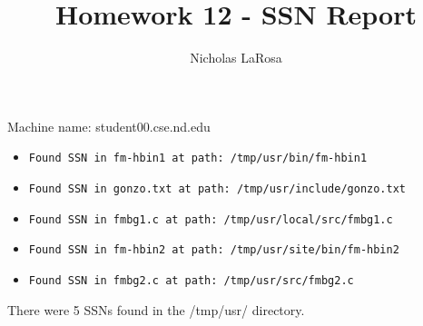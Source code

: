 \documentclass{article}
\begin{document}
\title{Homework 12 - SSN Report}
\author{Nicholas LaRosa}
\maketitle
Machine name: student00.cse.nd.edu
\begin{itemize}[leftmargin=0cm]
\item \begin{verbatim}Found SSN in fm-hbin1 at path: /tmp/usr/bin/fm-hbin1\end{verbatim}
\item \begin{verbatim}Found SSN in gonzo.txt at path: /tmp/usr/include/gonzo.txt\end{verbatim}
\item \begin{verbatim}Found SSN in fmbg1.c at path: /tmp/usr/local/src/fmbg1.c\end{verbatim}
\item \begin{verbatim}Found SSN in fm-hbin2 at path: /tmp/usr/site/bin/fm-hbin2\end{verbatim}
\item \begin{verbatim}Found SSN in fmbg2.c at path: /tmp/usr/src/fmbg2.c\end{verbatim}
\end{itemize}
There were 5 SSNs found in the /tmp/usr/ directory.
\end{document}
